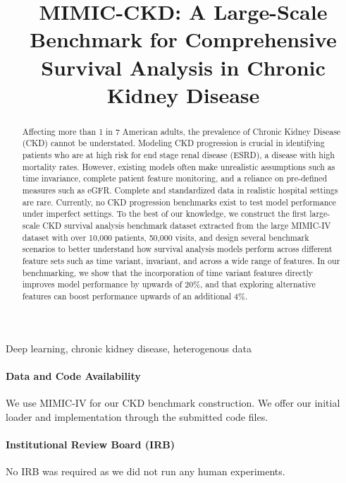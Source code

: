 \documentclass[pmlr,twocolumn,10pt]{jmlr} %
\title[MIMIC-CKD Benchmark]{MIMIC-CKD: A Large-Scale Benchmark for Comprehensive Survival Analysis in Chronic Kidney Disease}
\begin{document}
\maketitle

\begin{abstract}
Affecting more than 1 in 7 American adults, the prevalence of Chronic Kidney Disease (CKD) cannot be understated. Modeling CKD progression is crucial in identifying patients who are at high risk for end stage renal disease (ESRD), a disease with high mortality rates. However, existing models often make unrealistic assumptions such as time invariance, complete patient feature monitoring, and a reliance on pre-defined measures such as eGFR. Complete and standardized data in realistic hospital settings are rare. Currently, no CKD progression benchmarks exist to test model performance under imperfect settings. To the best of our knowledge, we construct the first large-scale CKD survival analysis benchmark dataset extracted from the large MIMIC-IV dataset with over 10,000 patients, 50,000 visits, and design several benchmark scenarios to better understand how survival analysis models perform across different feature sets such as time variant, invariant, and across a wide range of features. In our benchmarking, we show that the incorporation of time variant features directly improves model performance by upwards of 20\%, and that exploring alternative features can boost performance upwards of an additional 4\%.
\end{abstract}

\begin{keywords}
Deep learning, chronic kidney disease, heterogenous data
\end{keywords}

\paragraph*{Data and Code Availability}
We use MIMIC-IV \citep{johnson2023mimic_ehr} for our CKD benchmark construction. We offer our initial loader and implementation through the submitted code files.

\paragraph*{Institutional Review Board (IRB)}
No IRB was required as we did not run any human experiments.







\clearpage


%
%
\end{document}
